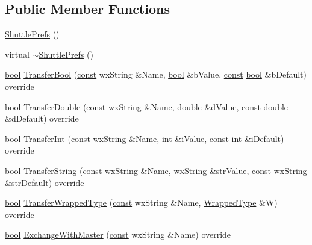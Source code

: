 \subsection*{Public Member Functions}
\begin{DoxyCompactItemize}
\item 
\hyperlink{class_shuttle_prefs_a9a46517993f3d386c9b1834aba41bb09}{Shuttle\+Prefs} ()
\item 
virtual \hyperlink{class_shuttle_prefs_a162c7f23a81e7dafeb29d170b8d421f4}{$\sim$\+Shuttle\+Prefs} ()
\item 
\hyperlink{mac_2config_2i386_2lib-src_2libsoxr_2soxr-config_8h_abb452686968e48b67397da5f97445f5b}{bool} \hyperlink{class_shuttle_prefs_ac4bb83cc336e778a79cc0022507395dc}{Transfer\+Bool} (\hyperlink{getopt1_8c_a2c212835823e3c54a8ab6d95c652660e}{const} wx\+String \&Name, \hyperlink{mac_2config_2i386_2lib-src_2libsoxr_2soxr-config_8h_abb452686968e48b67397da5f97445f5b}{bool} \&b\+Value, \hyperlink{getopt1_8c_a2c212835823e3c54a8ab6d95c652660e}{const} \hyperlink{mac_2config_2i386_2lib-src_2libsoxr_2soxr-config_8h_abb452686968e48b67397da5f97445f5b}{bool} \&b\+Default) override
\item 
\hyperlink{mac_2config_2i386_2lib-src_2libsoxr_2soxr-config_8h_abb452686968e48b67397da5f97445f5b}{bool} \hyperlink{class_shuttle_prefs_aba7a3202f76f8dd8dfd8f19a450e2c10}{Transfer\+Double} (\hyperlink{getopt1_8c_a2c212835823e3c54a8ab6d95c652660e}{const} wx\+String \&Name, double \&d\+Value, \hyperlink{getopt1_8c_a2c212835823e3c54a8ab6d95c652660e}{const} double \&d\+Default) override
\item 
\hyperlink{mac_2config_2i386_2lib-src_2libsoxr_2soxr-config_8h_abb452686968e48b67397da5f97445f5b}{bool} \hyperlink{class_shuttle_prefs_a107e63713a38f34d80f6fe93451569d1}{Transfer\+Int} (\hyperlink{getopt1_8c_a2c212835823e3c54a8ab6d95c652660e}{const} wx\+String \&Name, \hyperlink{xmltok_8h_a5a0d4a5641ce434f1d23533f2b2e6653}{int} \&i\+Value, \hyperlink{getopt1_8c_a2c212835823e3c54a8ab6d95c652660e}{const} \hyperlink{xmltok_8h_a5a0d4a5641ce434f1d23533f2b2e6653}{int} \&i\+Default) override
\item 
\hyperlink{mac_2config_2i386_2lib-src_2libsoxr_2soxr-config_8h_abb452686968e48b67397da5f97445f5b}{bool} \hyperlink{class_shuttle_prefs_a07728e9f8c3fbaca49f18944b759407a}{Transfer\+String} (\hyperlink{getopt1_8c_a2c212835823e3c54a8ab6d95c652660e}{const} wx\+String \&Name, wx\+String \&str\+Value, \hyperlink{getopt1_8c_a2c212835823e3c54a8ab6d95c652660e}{const} wx\+String \&str\+Default) override
\item 
\hyperlink{mac_2config_2i386_2lib-src_2libsoxr_2soxr-config_8h_abb452686968e48b67397da5f97445f5b}{bool} \hyperlink{class_shuttle_prefs_a2e040d989097665684acb3af86290010}{Transfer\+Wrapped\+Type} (\hyperlink{getopt1_8c_a2c212835823e3c54a8ab6d95c652660e}{const} wx\+String \&Name, \hyperlink{class_wrapped_type}{Wrapped\+Type} \&W) override
\item 
\hyperlink{mac_2config_2i386_2lib-src_2libsoxr_2soxr-config_8h_abb452686968e48b67397da5f97445f5b}{bool} \hyperlink{class_shuttle_prefs_ac9cd02eb315d6f041fbdbd4f525c4c9e}{Exchange\+With\+Master} (\hyperlink{getopt1_8c_a2c212835823e3c54a8ab6d95c652660e}{const} wx\+String \&Name) override
\end{DoxyCompactItemize}
